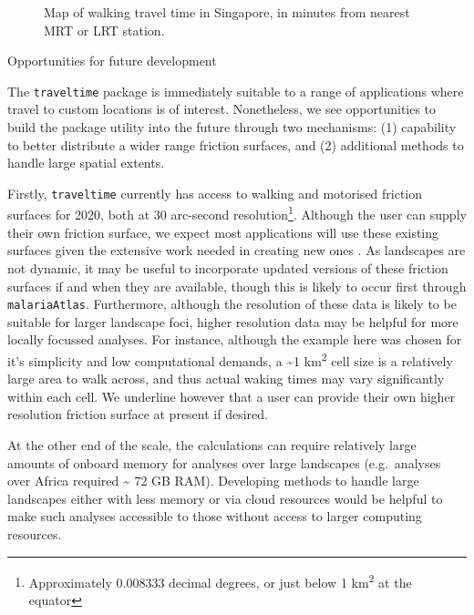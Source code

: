 \documentclass[
  12pt]{article}
\begin{document}
\begin{figure}


\caption{\label{fig-result}Map of walking travel time in Singapore, in
minutes from nearest MRT or LRT station.}

\end{figure}%

Opportunities for future development

The \texttt{traveltime} package is immediately suitable to a range of
applications where travel to custom locations is of interest.
Nonetheless, we see opportunities to build the package utility into the
future through two mechanisms: (1) capability to better distribute a
wider range friction surfaces, and (2) additional methods to handle
large spatial extents.

Firstly, \texttt{traveltime} currently has access to walking and
motorised friction surfaces for 2020, both at 30 arc-second
resolution\footnote{Approximately 0.008333 decimal degrees, or just
  below 1 km\textsuperscript{2} at the equator}. Although the user can
supply their own friction surface, we expect most applications will use
these existing surfaces given the extensive work needed in creating new
ones \citep{weiss2018global, weiss2020global}. As landscapes are not
dynamic, it may be useful to incorporate updated versions of these
friction surfaces if and when they are available, though this is likely
to occur first through \texttt{malariaAtlas}. Furthermore, although the
resolution of these data is likely to be suitable for larger landscape
foci, higher resolution data may be helpful for more locally focussed
analyses. For instance, although the example here was chosen for it's
simplicity and low computational demands, a \textasciitilde1
km\textsuperscript{2} cell size is a relatively large area to walk
across, and thus actual waking times may vary significantly within each
cell. We underline however that a user can provide their own higher
resolution friction surface at present if desired.

At the other end of the scale, the calculations can require relatively
large amounts of onboard memory for analyses over large landscapes
(e.g.~analyses over Africa required \textasciitilde{} 72 GB RAM).
Developing methods to handle large landscapes either with less memory or
via cloud resources would be helpful to make such analyses accessible to
those without access to larger computing resources.
\end{document}
